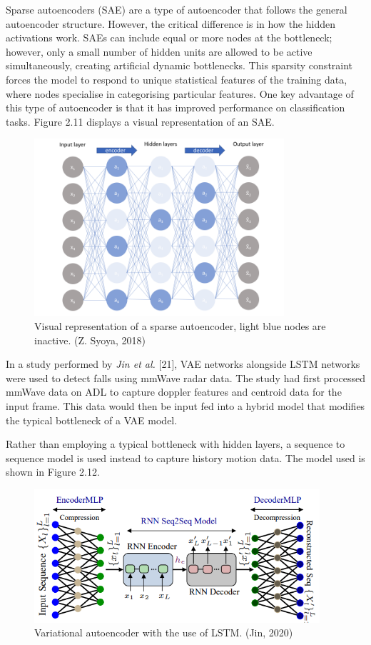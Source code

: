 Sparse autoencoders (SAE) are a type of autoencoder that follows the general autoencoder structure. However, the critical difference is in how the hidden activations work. SAEs can include equal or more nodes at the bottleneck; however, only a small number of hidden units are allowed to be active simultaneously, creating artificial dynamic bottlenecks. This sparsity constraint forces the model to respond to unique statistical features of the training data, where nodes specialise in categorising particular features. One key advantage of this type of autoencoder is that it has improved performance on classification tasks. Figure 2.11 displays a visual representation of an SAE.

\begin{figure}[H]
    \centering
    \includegraphics[width=350px, keepaspectratio]{asd.png}
    \vspace{1ex}%
    \caption{Visual representation of a sparse autoencoder, light blue nodes are inactive. (Z. Syoya, 2018)}
    \label{fig:my_label}
\end{figure}


In a study performed by \textit{Jin et al.} [21], VAE networks alongside LSTM networks were used to detect falls using mmWave radar data. The study had first processed mmWave data on ADL to capture doppler features and centroid data for the input frame. This data would then be input fed into a hybrid model that modifies the typical bottleneck of a VAE model. 

Rather than employing a typical bottleneck with hidden layers, a sequence to sequence model is used instead to capture history motion data. The model used is shown in Figure 2.12. 

\begin{figure}[H]
    \centering
    \includegraphics[width=400px, keepaspectratio]{hvae.png}
    \vspace{1ex}%
    \caption{Variational autoencoder with the use of LSTM. (Jin, 2020)}
    \label{fig:my_label}
\end{figure}

